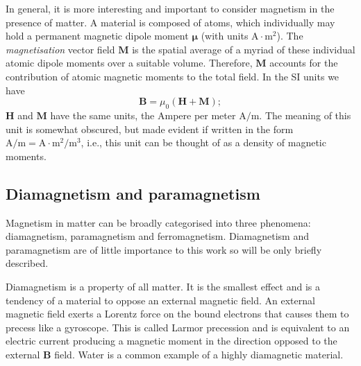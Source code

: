 In general, it is more interesting and important to consider magnetism in the presence of matter. A material is composed of atoms, which individually may hold a permanent magnetic dipole moment $\boldsymbol{\mu}$ (with units $\text{A}\cdot \text{m}^2$). The \textit{magnetisation} vector field $\boldsymbol{M}$ is the spatial average of a myriad of these individual atomic dipole moments over a suitable volume. Therefore, $\boldsymbol{M}$ accounts for the contribution of atomic magnetic moments to the total field. In the SI units we have
\begin{equation}
\boldsymbol{B} = \mu_0 (\boldsymbol{H}+\boldsymbol{M});
\end{equation}
$\boldsymbol{H}$ and $\boldsymbol{M}$ have the same units, the Ampere per meter $\text{A}/\text{m}$. The meaning of this unit is somewhat obscured, but made evident if written in the form $\text{A}/\text{m} = \text{A}\cdot\text{m}^2/\text{m}^3$, i.e., this unit can be thought of as a density of magnetic moments.\par

\subsection{Diamagnetism and paramagnetism}
Magnetism in matter can be broadly categorised into three phenomena: diamagnetism, paramagnetism and ferromagnetism. Diamagnetism and paramagnetism are of little importance to this work so will be only briefly described.\par

Diamagnetism is a property of all matter. It is the smallest effect and is a tendency of a material to oppose an external magnetic field. An external magnetic field exerts a Lorentz force on the bound electrons that causes them to precess like a gyroscope. This is called Larmor precession and is equivalent to an electric current producing a magnetic moment in the direction opposed to the external $\boldsymbol{B}$ field. Water is a common example of a highly diamagnetic material.\par

